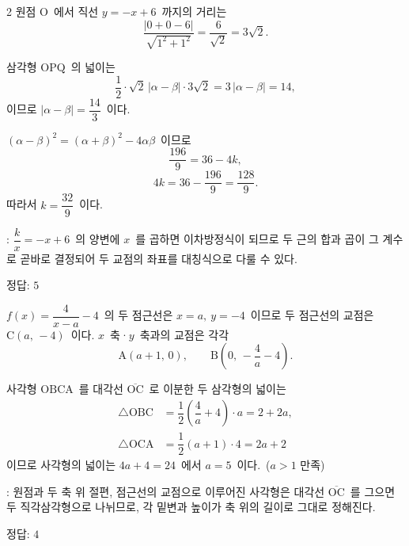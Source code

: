 \documentclass[10pt,fleqn]{article}
\begin{document}
\begin{multicols*}{2}
원점 $\mathrm{O}$\ 에서 직선 $y=-x+6$\ 까지의 거리는
\[ \dfrac{|0+0-6|}{\sqrt{1^{2}+1^{2}}}=\dfrac{6}{\sqrt{2}}=3\sqrt{2}. \]

삼각형 $\mathrm{OPQ}$\ 의 넓이는
\[ \dfrac{1}{2}\cdot\sqrt{2}\,|\alpha-\beta|\cdot 3\sqrt{2}=3\,|\alpha-\beta|=14, \]
이므로 $|\alpha-\beta|=\dfrac{14}{3}$\ 이다.

$(\alpha-\beta)^{2}=(\alpha+\beta)^{2}-4\alpha\beta$\ 이므로
\[ \dfrac{196}{9}=36-4k, \]
\[ 4k=36-\dfrac{196}{9}=\dfrac{128}{9}. \]
따라서 $k=\dfrac{32}{9}$\ 이다.

\begin{dmcriticalpoint}
: $\dfrac{k}{x}=-x+6$\ 의 양변에 $x$\ 를 곱하면 이차방정식이 되므로 두 근의 합과 곱이 그 계수로 곧바로 결정되어 두 교점의 좌표를 대칭식으로 다룰 수 있다.
\end{dmcriticalpoint}

\begin{dmanswerbox}
정답: $5$
\end{dmanswerbox}

$f(x)=\dfrac{4}{x-a}-4$\ 의 두 점근선은 $x=a,\ y=-4$\ 이므로 두 점근선의 교점은 $\mathrm{C}(a,\, -4)$\ 이다. $x$\ 축·$y$\ 축과의 교점은 각각
$$\mathrm{A}(a+1,\, 0),\qquad \mathrm{B}\!\left(0,\, -\dfrac{4}{a}-4\right).$$

사각형 $\mathrm{OBCA}$\ 를 대각선 $\overline{\mathrm{OC}}$\ 로 이분한 두 삼각형의 넓이는
\begin{align*}
\triangle\mathrm{OBC}
  &=\dfrac{1}{2}\!\left(\dfrac{4}{a}+4\right)\!\cdot a=2+2a, \\
\triangle\mathrm{OCA}
  &=\dfrac{1}{2}(a+1)\cdot 4=2a+2
\end{align*}
이므로 사각형의 넓이는 $4a+4=24$\ 에서 $a=5$\ 이다.\ ($a>1$ 만족)

\begin{dmcriticalpoint}
: 원점과 두 축 위 절편, 점근선의 교점으로 이루어진 사각형은 대각선 $\overline{\mathrm{OC}}$\ 를 그으면 두 직각삼각형으로 나뉘므로, 각 밑변과 높이가 축 위의 길이로 그대로 정해진다.
\end{dmcriticalpoint}

\begin{dmanswerbox}
정답: $4$
\end{dmanswerbox}


\end{multicols*}
\end{document}

